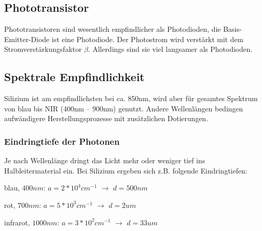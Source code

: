 \subsection{Phototransistor}
Phototransistoren sind wesentlich empfindlicher als Photodioden, die Basis-Emitter-Diode ist eine Photodiode. Der Photostrom wird verstärkt mit dem Stromverstärkungsfaktor $\beta$. Allerdings sind sie viel langsamer als Photodioden.

\subsection{Spektrale Empfindlichkeit}
Silizium ist am empfindlichsten bei ca. 850nm, wird aber für gesamtes Spektrum von blau bis NIR (400nm – 900nm) genutzt. Andere Wellenlängen bedingen aufwändigere Herstellungsprozesse mit zusätzlichen Dotierungen.

\subsubsection{Eindringtiefe der Photonen}
Je nach Wellenlänge dringt das Licht mehr oder weniger tief ins Halbleitermaterial ein. Bei Silizium ergeben sich z.B. folgende Eindringtiefen:
\begin{compactitem}
    \item blau, $400nm$: $a = 2*10^4cm^{-1}$ $\rightarrow$ $d=500nm$
    \item rot, $700nm$: $a = 5*10^3cm^{-1}$ $\rightarrow$ $d=2um$
    \item infrarot, $1000nm$: $a = 3*10^2cm^{-1}$ $\rightarrow$ $d=33um$
\end{compactitem}


